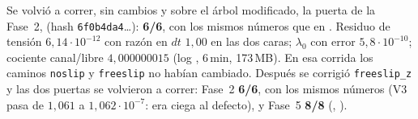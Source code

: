 Se volvió a correr, sin cambios y sobre el árbol modificado, la puerta de la Fase~2,
 (hash \texttt{6f0b4da4}\ldots):
\textbf{6/6}, con los mismos números que en . Residuo de tensión
$6{,}14\cdot10^{-12}$ con razón en $dt$ $1{,}00$ en las dos caras; $\lambda_0$ con error
$5{,}8\cdot10^{-10}$; cociente canal/libre $4{,}000000015$ (log
, 6\,min, 173\,MB). En esa corrida los caminos \texttt{noslip} y \texttt{freeslip} no
habían cambiado. Después se corrigió \texttt{freeslip\_z}  y las dos puertas se
volvieron a correr: Fase~2 \textbf{6/6}, con los mismos números (V3 pasa de $1{,}061$ a
$1{,}062\cdot10^{-7}$: era ciega al defecto), y Fase~5 \textbf{8/8}
(,
).
